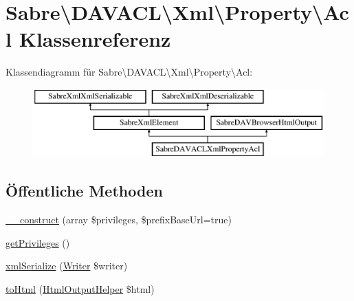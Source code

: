 \hypertarget{class_sabre_1_1_d_a_v_a_c_l_1_1_xml_1_1_property_1_1_acl}{}\section{Sabre\textbackslash{}D\+A\+V\+A\+CL\textbackslash{}Xml\textbackslash{}Property\textbackslash{}Acl Klassenreferenz}
\label{class_sabre_1_1_d_a_v_a_c_l_1_1_xml_1_1_property_1_1_acl}
Klassendiagramm für Sabre\textbackslash{}D\+A\+V\+A\+CL\textbackslash{}Xml\textbackslash{}Property\textbackslash{}Acl\+:\begin{figure}[H]
\begin{center}
\leavevmode
\includegraphics[height=2.654028cm]{class_sabre_1_1_d_a_v_a_c_l_1_1_xml_1_1_property_1_1_acl}
\end{center}
\end{figure}
\subsection*{Öffentliche Methoden}
\begin{DoxyCompactItemize}
\item 
\mbox{\hyperlink{class_sabre_1_1_d_a_v_a_c_l_1_1_xml_1_1_property_1_1_acl_aa23faf7213acac4451e9eadcdedd1787}{\+\_\+\+\_\+construct}} (array \$privileges, \$prefix\+Base\+Url=true)
\item 
\mbox{\hyperlink{class_sabre_1_1_d_a_v_a_c_l_1_1_xml_1_1_property_1_1_acl_af922c4e34f99d128d1ce8397bff79b7f}{get\+Privileges}} ()
\item 
\mbox{\hyperlink{class_sabre_1_1_d_a_v_a_c_l_1_1_xml_1_1_property_1_1_acl_a2670dfe65ae9d0745f9785c297a5b320}{xml\+Serialize}} (\mbox{\hyperlink{class_sabre_1_1_xml_1_1_writer}{Writer}} \$writer)
\item 
\mbox{\hyperlink{class_sabre_1_1_d_a_v_a_c_l_1_1_xml_1_1_property_1_1_acl_a8540f16d374d6ce80a2555ddcb50468e}{to\+Html}} (\mbox{\hyperlink{class_sabre_1_1_d_a_v_1_1_browser_1_1_html_output_helper}{Html\+Output\+Helper}} \$html)
\end{DoxyCompactItemize}
